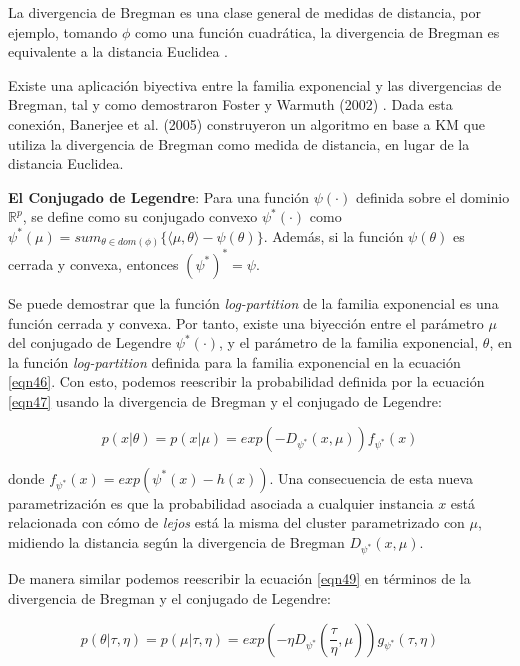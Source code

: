 La divergencia de Bregman es una clase general de medidas de distancia, por ejemplo, tomando $\phi$ como una función cuadrática, la divergencia de Bregman es equivalente a la distancia Euclidea \cite{Banerjee:2005}.

Existe una aplicación biyectiva entre la familia exponencial y las divergencias de Bregman, tal y como demostraron Foster y Warmuth (2002) \cite{Forster:2002}. Dada esta conexión, Banerjee et al. (2005) \cite{Banerjee:2005} construyeron un algoritmo en base a \acf{KM} que utiliza la divergencia de Bregman como medida de distancia, en lugar de la distancia Euclidea.

\begin{definicion}
	
	\textbf{El Conjugado de Legendre}: Para una función $\psi(\cdot)$ definida sobre el dominio $\mathbb{R}^p$, se define como su conjugado convexo $\psi^*(\cdot)$ como $\psi^*(\mu) = sum_{\theta \in dom(\phi)}\{\langle \mu, \theta \rangle - \psi(\theta) \}$. Además, si la función $\psi(\theta)$ es cerrada y convexa, entonces $(\psi^*)^* = \psi$. \cite{RDPM:2015}
	
\end{definicion}


Se puede demostrar que la función \textit{log-partition} de la familia exponencial es una función cerrada y convexa. Por tanto, existe una biyección entre el parámetro $\mu$ del conjugado de Legendre $\psi^*(\cdot)$, y el parámetro de la familia exponencial, $\theta$, en la función \textit{log-partition} definida para la familia exponencial en la ecuación \ref{eqn46}. Con esto, podemos reescribir la probabilidad definida por la ecuación \ref{eqn47} usando la divergencia de Bregman y el conjugado de Legendre:

\begin{equation}
p(x|\theta) = p(x|\mu) = exp(-D_{\psi^*}(x, \mu)) f_{\psi^*}(x)
\label{eqn54}
\end{equation}

donde $f_{\psi^*}(x) = exp(\psi^*(x) - h(x))$. Una consecuencia de esta nueva parametrización es que la probabilidad asociada a cualquier instancia $x$ está relacionada con cómo de \textit{lejos} está la misma del cluster parametrizado con $\mu$, midiendo la distancia según la divergencia de Bregman $D_{\psi^*}(x, \mu)$.

De manera similar podemos reescribir la ecuación \ref{eqn49} en términos de la divergencia de Bregman y el conjugado de Legendre:

\begin{equation}
p(\theta|\tau, \eta) = p(\mu|\tau, \eta) = exp \left(-\eta D_{\psi^*}(\frac{\tau}{\eta}, \mu)\right) g_{\psi^*}(\tau, \eta)
\label{eqn55}
\end{equation}

